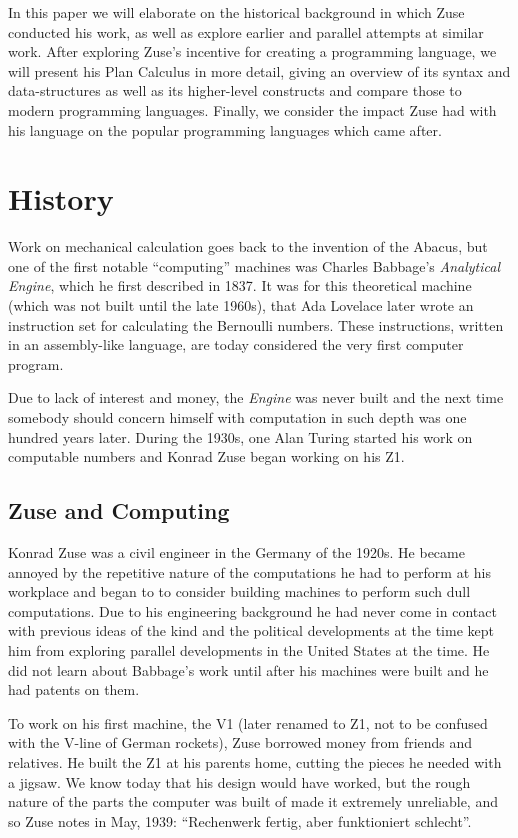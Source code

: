\documentclass{llncs}
\begin{document}
   In this paper we will elaborate on the historical background in which 
   Zuse conducted his work, as well as explore earlier and parallel attempts 
   at similar work. After exploring Zuse's incentive for creating a programming 
   language, we will present his Plan Calculus in more detail, giving an overview 
   of its syntax and data-structures as well as its higher-level constructs and compare 
   those to modern programming languages. Finally, we consider the impact Zuse
   had with his language on the popular programming languages which came after.
 \section{History}
   Work on mechanical calculation goes back to the invention of the Abacus, but one 
   of the first notable ``computing'' machines was Charles Babbage's \emph{Analytical Engine},
   which he first described in 1837. It was for this theoretical machine (which was not built until the 
   late 1960s), that Ada Lovelace later wrote an instruction set for calculating the Bernoulli numbers\cite{hyman1985Charles}.
   These instructions, written in an assembly-like language, are today considered the very first computer program.

   Due to lack of interest and money, the \emph{Engine} was never built and the next 
   time somebody should concern himself with computation in such depth was 
   one hundred years later. During the 1930s, one Alan Turing started his work on computable numbers\cite{turing1936computable}
   and Konrad Zuse began working on his Z1.
 \subsection{Zuse and Computing}
   Konrad Zuse was a civil engineer in the Germany of the 1920s. He became annoyed by
   the repetitive nature of the computations he had to perform at his workplace and began to 
   to consider building machines to perform such dull computations.
   Due to his engineering background he had never come in contact with previous 
   ideas of the kind and the political developments at the time kept him 
   from exploring parallel developments in the United States at the time. He did not learn
   about Babbage's work until after his machines were built and he had patents on them\cite{epegmagHorstzuse}.

   To work on his first machine, the V1 (later renamed to Z1, not to be 
   confused with the V-line of German rockets), Zuse borrowed money
   from friends and relatives. He built the Z1 at his parents home, cutting the 
   pieces he needed with a jigsaw. We know today that his design would have worked,
   but the rough nature of the parts the computer was built of made it extremely unreliable,
   and so Zuse notes in May, 1939: ``Rechenwerk fertig, aber funktioniert schlecht''\cite{rojas2002plankalkuel}.
\end{document}
